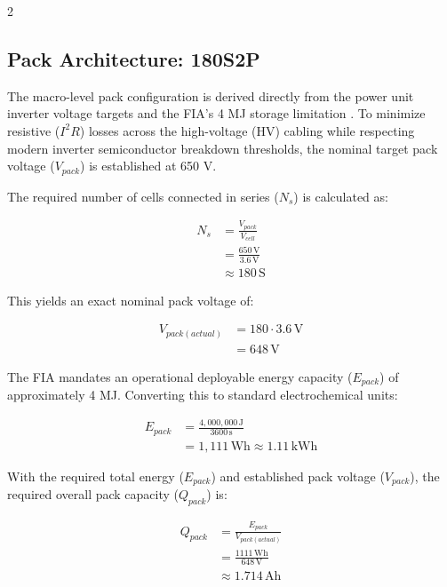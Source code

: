 \begin{multicols}{2}
\subsection{Pack Architecture: 180S2P}

The macro-level pack configuration is derived directly from the power unit inverter voltage targets and the FIA's 4 MJ storage limitation \cite{FIA_2026_PU_Regulations}. To minimize resistive ($I^2R$) losses across the high-voltage (HV) cabling while respecting modern inverter semiconductor breakdown thresholds, the nominal target pack voltage ($V_{pack}$) is established at 650 V. 

The required number of cells connected in series ($N_s$) is calculated as:

\begin{equation} \label{eq:series_cells}
\begin{split}
N_s &= \frac{V_{pack}}{V_{cell}} \\
&= \frac{650\,\mathrm{V}}{3.6\,\mathrm{V}} \\
&\approx 180\,\mathrm{S}
\end{split}
\end{equation}

This yields an exact nominal pack voltage of:

\begin{equation} \label{eq:actual_voltage}
\begin{split}
V_{pack(actual)} &= 180 \cdot 3.6\,\mathrm{V} \\
&= 648\,\mathrm{V}
\end{split}
\end{equation}

The FIA mandates an operational deployable energy capacity ($E_{pack}$) of approximately 4 MJ. Converting this to standard electrochemical units:

\begin{equation} \label{eq:mj_conversion}
\begin{split}
E_{pack} &= \frac{4,000,000\,\mathrm{J}}{3600\,\mathrm{s}} \\
&= 1,111\,\mathrm{Wh} \approx 1.11\,\mathrm{kWh}
\end{split}
\end{equation}

With the required total energy ($E_{pack}$) and established pack voltage ($V_{pack}$), the required overall pack capacity ($Q_{pack}$) is:

\begin{equation} \label{eq:pack_capacity}
\begin{split}
Q_{pack} &= \frac{E_{pack}}{V_{pack(actual)}} \\
&= \frac{1111\,\mathrm{Wh}}{648\,\mathrm{V}} \\
&\approx 1.714\,\mathrm{Ah}
\end{split}
\end{equation}


\end{multicols}

